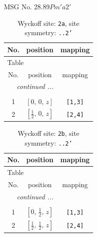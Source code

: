 \documentclass[fleqn,8pt]{jsarticle}
\begin{document}
\setcounter{MaxMatrixCols}{32}

\renewcommand{\tablename}{Table~}
\renewcommand{\figurename}{Figure~}
\begin{center}
\LARGE
MSG No. 28.89\quad$Pm'a2'$
\end{center}
\renewcommand{\arraystretch}{1.2}
\begin{longtable}{ccc}
\caption{Wyckoff site: {\tt 2a}, site symmetry: {\tt ..2'}}
 \\
 \hline \hline
No. & position & mapping \\ \hline \endfirsthead

\multicolumn{2}{l}{\tablename\ \thetable{}} \\
 \hline \hline
No. & position & mapping \\ \hline \endhead

 \hline \hline
\multicolumn{2}{r}{\footnotesize\it continued ...} \\ \endfoot

 \hline \hline
\multicolumn{2}{r}{} \\ \endlastfoot

1 & $\left[ 0,\, 0,\, z \right]$ & {\tt [1,3]} \\ \hline
2 & $\left[ \frac{1}{2},\, 0,\, z \right]$ & {\tt [2,4]} \\
\end{longtable}
\renewcommand{\arraystretch}{1.2}
\begin{longtable}{ccc}
\caption{Wyckoff site: {\tt 2b}, site symmetry: {\tt ..2'}}
 \\
 \hline \hline
No. & position & mapping \\ \hline \endfirsthead

\multicolumn{2}{l}{\tablename\ \thetable{}} \\
 \hline \hline
No. & position & mapping \\ \hline \endhead

 \hline \hline
\multicolumn{2}{r}{\footnotesize\it continued ...} \\ \endfoot

 \hline \hline
\multicolumn{2}{r}{} \\ \endlastfoot

1 & $\left[ 0,\, \frac{1}{2},\, z \right]$ & {\tt [1,3]} \\ \hline
2 & $\left[ \frac{1}{2},\, \frac{1}{2},\, z \right]$ & {\tt [2,4]} \\
\end{longtable}
\renewcommand{\arraystretch}{1.2}
\end{document}

